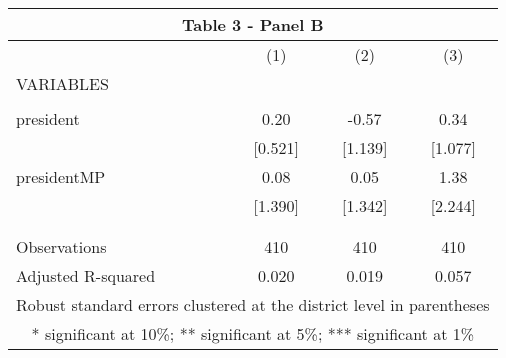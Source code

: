 \begin{tabular}{lccc}
\multicolumn{4}{c}{Table 3 - Panel B} \\ \hline
 & (1) & (2) & (3) \\
VARIABLES &  &  &  \\ \hline
 &  &  &  \\
president & 0.20 & -0.57 & 0.34 \\
 & [0.521] & [1.139] & [1.077] \\
presidentMP & 0.08 & 0.05 & 1.38 \\
 & [1.390] & [1.342] & [2.244] \\
 &  &  &  \\
 &  &  &  \\
Observations & 410 & 410 & 410 \\
 Adjusted R-squared & 0.020 & 0.019 & 0.057 \\ \hline
\multicolumn{4}{c}{ Robust standard errors clustered at the district level in parentheses} \\
\multicolumn{4}{c}{ * significant at 10\%; ** significant at 5\%; *** significant at 1\%} \\
\end{tabular}
